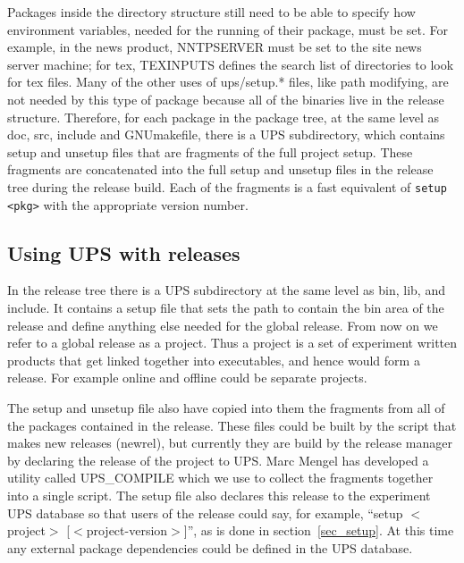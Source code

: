     Packages inside the directory structure still need to be able to 
specify how environment variables,
    needed for the running of their package, must be set. For example, in the 
news product, NNTPSERVER
    must be set to the site news server machine; for tex, TEXINPUTS defines the
search list of directories to
    look for tex files. Many of the other uses of ups/setup.* files, like path 
modifying, are not needed by this type
    of package because all of the binaries live in the release structure. 
Therefore, for each
    package in the package tree, at the same level as doc, src, include and 
GNUmakefile, there is a UPS 
    subdirectory, which contains setup and unsetup files that are 
fragments of the
full project setup. These fragments are concatenated into the full setup 
and unsetup files in the release tree during the release build. 
Each of the fragments is a fast
equivalent of \texttt{setup <pkg>} with the appropriate version number.

\subsection{Using UPS with releases}

    In the release tree there is a UPS subdirectory at the same level as 
bin, lib, and include. It 
    contains a setup file that sets the path to contain the bin area of the
release and define anything else
    needed for the global release. 
From now on we refer to a global release
as a project. Thus a project is a set of experiment written products that 
get linked together into executables, and hence would form a release.  For
example online and offline could be separate projects.

The setup and unsetup file also have copied into them the 
fragments from all of the packages 
    contained in the release. These files could be built by the script that 
makes new releases (newrel), but currently they are build by the release 
manager by declaring the release of the project to UPS.  Marc Mengel has 
developed a utility called
UPS\_COMPILE which we use to collect the fragments together into a 
single script. The setup file
    also declares this release to the experiment UPS database so that users of 
the release could say, for example, ``setup $<$project$>$ 
[$<$project-version$>$]'', as is done in section~\ref{sec_setup}.
At this time any external package dependencies could be
defined in the UPS database.

